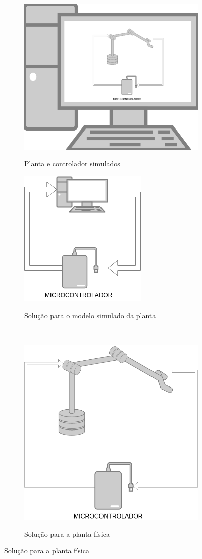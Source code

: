 \begin{figure}[h!]
  
  \centering
  \caption{Diagramas das etapas da técnica \textit{Hardware-in-the-loop}}
  \begin{subfigure}{.5\textwidth}
    \centering
    \caption{Planta e controlador simulados}
    \includegraphics[width = 0.6\columnwidth]{Imagens/plantaSimulada.png}
    \label{fig:plantaSimulada}
  \end{subfigure}%
  \begin{subfigure}{.5\textwidth}
    \centering
    \caption{Solução para o modelo simulado da planta}
    \includegraphics[width = 0.5\columnwidth]{Imagens/solucaoModelo.png}
    \label{fig:solucaoModelo}
  \end{subfigure}%
  \\[5ex]
  \begin{subfigure}{\textwidth}
    \centering
    \caption{Solução para a planta física}
    \includegraphics[width = 0.4\columnwidth]{Imagens/solucaoPlanta.png}
    \label{fig:solucaoPlanta}
  \end{subfigure}%
  
  \label{fig:simulacoes} 

\end{figure}

